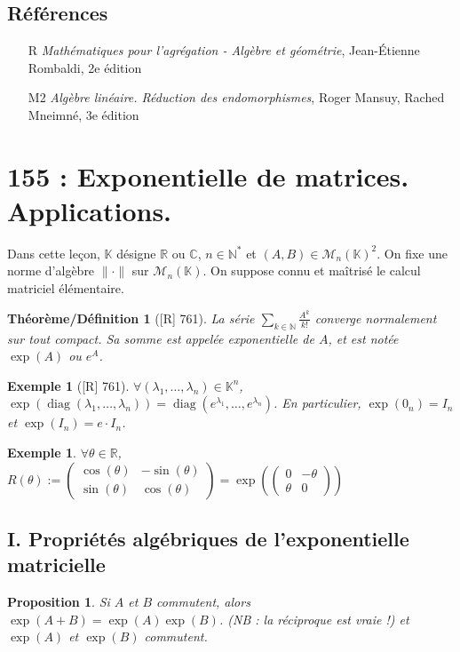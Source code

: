 \documentclass[10pt, a4paper, parskip=full, twoside, twocolumn]{report}
\newtheorem{theorem_def}[definition]{Théorème/Définition}
\newtheorem{proposition}[definition]{Proposition}
\newtheorem{example}[definition]{Exemple}
\newcommand{\IN}{\mathbb{N}}
\newcommand{\IK}{\mathbb{K}}
\newcommand{\IC}{\mathbb{C}}
\newcommand{\IR}{\mathbb{R}}
\newcommand{\M}{\mathcal{M}}
\DeclareMathOperator{\diag}{diag}
\begin{document}
\section*{Références}
\begin{itemize}
	\item[R] \emph{Mathématiques pour l'agrégation - Algèbre et géométrie}, Jean-Étienne Rombaldi, 2e édition
	\item[M2] \emph{Algèbre linéaire. Réduction des endomorphismes}, Roger Mansuy, Rached Mneimné, 3e édition
\end{itemize}




\chapter*{155 : Exponentielle de matrices. Applications.}
\setcounter{definition}{0}

\textcolor{paragraphtext}{Dans cette leçon, $\IK$ désigne $\IR$ ou $\IC$, $n\in \IN^*$
et $(A,B)\in\M_n(\IK)^2$. On fixe une norme d'algèbre $\|\cdot\|$ sur $\M_n(\IK)$.
On suppose connu et maîtrisé le calcul matriciel élémentaire.}

\begin{theorem_def}[\textnormal{[R] 761}]
	La série $\sum_{k\in\IN} \frac{A^k}{k!}$ converge normalement sur 
	tout compact. Sa somme est appelée \emph{exponentielle de $A$}, et est notée $\exp(A)$ ou $e^A$.
\end{theorem_def}

\begin{example}[\textnormal{[R] 761}]
	$\forall (\lambda_1,\dots,\lambda_n)\in\IK^n$, $\exp(\diag(\lambda_1,\dots,\lambda_n)) = \diag(e^{\lambda_1},\dots,e^{\lambda_n})$.
	En particulier, $\exp(0_n) = I_n$ et $\exp(I_n) = e\cdot I_n$.
\end{example}

\begin{example}
	$\forall \theta\in\IR$, $R(\theta) := \begin{pmatrix}
		\cos(\theta) & -\sin(\theta) \\ \sin(\theta) & \cos(\theta)
	\end{pmatrix} = \exp\left(\begin{pmatrix}
		0 & -\theta \\ \theta & 0
	\end{pmatrix}\right)$
\end{example}

\section*{I. Propriétés algébriques de l'exponentielle matricielle}
\begin{proposition}
	Si $A$ et $B$ commutent, alors $\exp(A+B) = \exp(A)\exp(B)$.
	(NB : la réciproque est vraie !) et $\exp(A)$ et $\exp(B)$ commutent.
\end{proposition}
\end{document}
